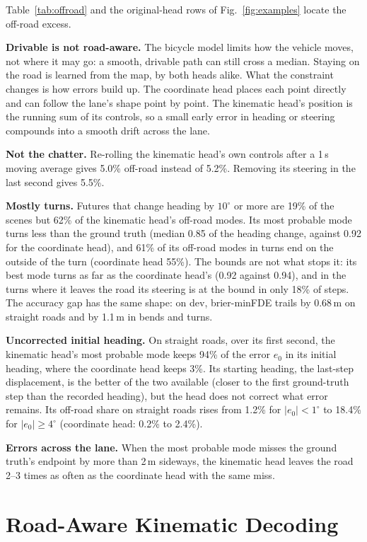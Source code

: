 \documentclass[conference]{IEEEtran}
\begin{document}
Table~\ref{tab:offroad} and the original-head rows of Fig.~\ref{fig:examples} locate the off-road excess.

\textbf{Drivable is not road-aware.} The bicycle model limits how the vehicle moves, not where it may
go: a smooth, drivable path can still cross a median. Staying on the road is learned from the map,
by both heads alike. What the constraint changes is how errors build up. The coordinate head places
each point directly and can follow the lane's shape point by point. The kinematic head's position is
the running sum of its controls, so a small early error in heading or steering compounds into a
smooth drift across the lane.

\textbf{Not the chatter.} Re-rolling the kinematic head's own controls after a 1\,s moving average
gives 5.0\% off-road instead of 5.2\%. Removing its steering in the last second gives 5.5\%.

\textbf{Mostly turns.} Futures that change heading by $10^\circ$ or more are 19\% of the scenes but
62\% of the kinematic head's off-road modes. Its most probable mode turns less than the ground
truth (median 0.85 of the heading change, against 0.92 for the coordinate head), and 61\% of its
off-road modes in turns end on the outside of the turn (coordinate head 55\%). The bounds are not
what stops it: its best mode turns as far as the coordinate head's (0.92 against 0.94), and in the
turns where it leaves the road its steering is at the bound in only 18\% of steps. The accuracy gap
has the same shape: on dev, brier-minFDE trails by 0.68\,m on straight roads and by 1.1\,m in bends
and turns.

\textbf{Uncorrected initial heading.} On straight roads, over its first second, the kinematic head's
most probable mode keeps 94\% of the error $e_0$ in its initial heading, where the coordinate head
keeps 3\%. Its starting heading, the last-step displacement, is the better of the two available
(closer to the first ground-truth step than the recorded heading), but the head does not correct
what error remains. Its off-road share on straight roads rises
from 1.2\% for $|e_0| < 1^\circ$ to 18.4\% for $|e_0| \ge 4^\circ$ (coordinate head: 0.2\% to 2.4\%).

\textbf{Errors across the lane.} When the most probable mode misses the ground truth's endpoint by
more than 2\,m sideways, the kinematic head leaves the road 2--3 times as often as the coordinate
head with the same miss.

\section{Road-Aware Kinematic Decoding}
\label{sec:roadaware}
\end{document}
